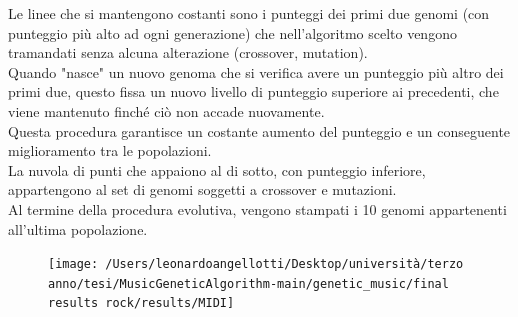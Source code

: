 \documentclass[a4paper,12pt]{report}
\begin{document}
Le linee che si mantengono costanti sono i punteggi dei primi due genomi (con punteggio più alto ad ogni generazione) che nell'algoritmo scelto vengono tramandati senza alcuna alterazione (crossover, mutation). \\
Quando "nasce" un nuovo genoma che si verifica avere un punteggio più altro dei primi due, questo fissa un nuovo livello di punteggio superiore ai precedenti, che viene mantenuto finché ciò non accade nuovamente. \\
Questa procedura garantisce un costante aumento del punteggio e un conseguente miglioramento tra le popolazioni. \\
La nuvola di punti che appaiono al di sotto, con punteggio inferiore, appartengono al set di genomi soggetti a crossover e mutazioni. \\
Al termine della procedura evolutiva, vengono stampati i 10 genomi appartenenti all'ultima popolazione.

\begin{figure}[H]
    \centering
    \texttt{[image: /Users/leonardoangellotti/Desktop/università/terzo anno/tesi/MusicGeneticAlgorithm-main/genetic\_music/final results rock/results/MIDI]} 
    \label{fig:immagine}
\end{figure}
\end{document}
